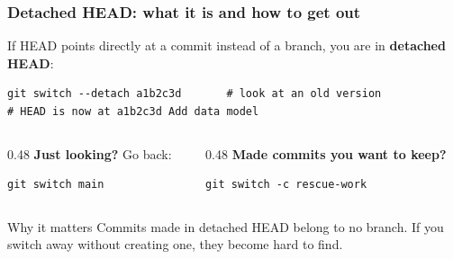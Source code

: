 \documentclass[aspectratio=169,10pt,compress]{beamer}
\begin{document}
\begin{frame}[t,fragile] \frametitle{Detached HEAD: what it is and how to get out}
  If HEAD points directly at a commit instead of a branch, you are in \textbf{detached HEAD}:
\begin{lstlisting}
git switch --detach a1b2c3d       # look at an old version
# HEAD is now at a1b2c3d Add data model
\end{lstlisting}

  \begin{columns}[T]
    \begin{column}{0.48\textwidth}
      \textbf{Just looking?} Go back:
\begin{lstlisting}
git switch main
\end{lstlisting}
    \end{column}
    \begin{column}{0.48\textwidth}
      \textbf{Made commits you want to keep?}
\begin{lstlisting}
git switch -c rescue-work
\end{lstlisting}
    \end{column}
  \end{columns}

  \vspace{0.5em}
  \begin{alertblock}{Why it matters}
    Commits made in detached HEAD belong to no branch. If you switch away without
    creating one, they become hard to find.
  \end{alertblock}
\end{frame}
\end{document}
